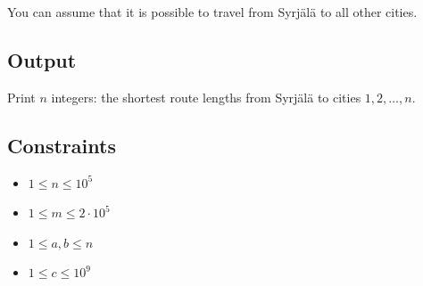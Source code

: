 \documentclass{article}
\begin{document}
You can assume that it is possible to travel from Syrjälä to all other cities.

\subsection*{Output}

Print $n$ integers: the shortest route lengths from Syrjälä to cities $1,2,\dots,n$.

\subsection*{Constraints}
\begin{itemize}
    \item $1 \le n \le 10^5$
    \item $1 \le m \le 2 \cdot 10^5$
    \item $1 \le a,b \le n$
    \item $1 \le c \le 10^9$
\end{itemize}

\vfill
\end{document}
